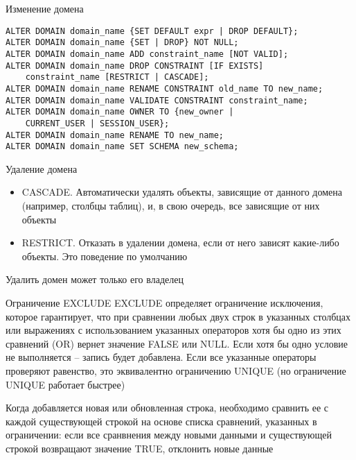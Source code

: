 \documentclass[12pt]{article}
\begin{document}
\begin{Example}{Изменение домена}
\begin{lstlisting}
ALTER DOMAIN domain_name {SET DEFAULT expr | DROP DEFAULT};
ALTER DOMAIN domain_name {SET | DROP} NOT NULL;
ALTER DOMAIN domain_name ADD constraint_name [NOT VALID];
ALTER DOMAIN domain_name DROP CONSTRAINT [IF EXISTS]
    constraint_name [RESTRICT | CASCADE];
ALTER DOMAIN domain_name RENAME CONSTRAINT old_name TO new_name;
ALTER DOMAIN domain_name VALIDATE CONSTRAINT constraint_name;
ALTER DOMAIN domain_name OWNER TO {new_owner |
    CURRENT_USER | SESSION_USER};
ALTER DOMAIN domain_name RENAME TO new_name;
ALTER DOMAIN domain_name SET SCHEMA new_schema;
\end{lstlisting}
\end{Example}

\begin{nota}{Удаление домена}
    \begin{itemize}
        \item CASCADE. Автоматически удалять объекты, зависящие от данного домена (например, столбцы таблиц), и, в свою очередь, все зависящие от них объекты
        \item RESTRICT. Отказать в удалении домена, если от него зависят какие-либо объекты. Это поведение по умолчанию 
    \end{itemize}

    Удалить домен может только его владелец 
\end{nota}

\begin{defin}{Ограничение EXCLUDE}
    EXCLUDE определяет ограничение исключения, которое гарантирует, что при сравнении любых двух строк в указанных столбцах или выражениях с использованием указанных операторов хотя бы одно из этих сравнений (OR) вернет значение FALSE или NULL. Если хотя бы одно условие не выполняется -- запись будет добавлена. Если все указанные операторы проверяют равенство, это эквивалентно ограничению UNIQUE (но ограничение UNIQUE работает быстрее)

    Когда добавляется новая или обновленная строка, необходимо сравнить ее с каждой существующей строкой на основе списка сравнений, указанных в ограничении: если все сранвнения между новыми данными и существующей строкой возвращают значение TRUE, отклонить новые данные 
\end{defin}
\end{document}
